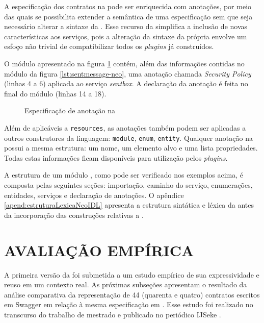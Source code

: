 A especificação dos contratos na \neoidl{} pode ser enriquecida com
anotações, por meio das quais se possibilita extender a semântica de uma
especificação sem que seja necessário alterar a sintaxe da \neoidl{}. Esse
recurso da \neoidl{} simplifica a inclusão de novas características aos
serviços, pois a alteração da sintaxe da própria \neoidl{} envolve um esfoço não
trivial de compatibilizar todos os \textit{plugins} já construídos.

O módulo apresentado na figura \ref{lst:annotationNeoIDL} contém, além das
informações contidas no módulo da figura \ref{lst:sentmessage-neo}, uma anotação chamada
\emph{Security Policy} (linhas 4 a 6) aplicada ao serviço \emph{sentbox}. A
declaração da anotação é feita no final do módulo (linhas 14 a 18).

\vspace{6mm}
 
\begin{figure}
\begin{small}

\vspace{-.5cm}
\end{small}
\caption{Especificação de anotação na \neoidl{}}
\label{lst:annotationNeoIDL}
\end{figure}

Além de aplicáveis a \texttt{resources}, as anotações também podem ser aplicadas
a outros construtores da linguagem: \texttt{module}, \texttt{enum},
\texttt{entity}. Qualquer anotação na \neoidl{} possui a mesma estrutura: um
nome, um elemento alvo e uma lista propriedades. Todas estas informações ficam
disponíveis para utilização pelos \textit{plugins}.

A estrutura de um módulo \neoidl{}, como pode ser verificado nos exemplos
acima, é composta pelas seguintes seções: importação, caminho do serviço,
enumerações, entidades, serviços e declaração de anotações. O apêndice 
\ref{apend:estruturaLexicaNeoIDL} apresenta a estrutura sintática e léxica da
\neoidl{} antes da incorporação das construções relativas a
\designbycontract{}.



\section{AVALIAÇÃO EMPÍRICA}
\vspace{-6mm}

A primeira versão da \neoidl{} foi submetida a um estudo empírico de sua expressividade 
e reuso em um contexto real. As próximas subseções apresentam 
o resultado da análise comparativa da representação de 44 (quarenta e quatro)
contratos escritos em Swagger em relação à mesma especificação em \neoidl{}.
Esse estudo foi realizado no transcurso do trabalho de mestrado e 
publicado no periódico IJSeke \cite{lima2015neoidl}.

